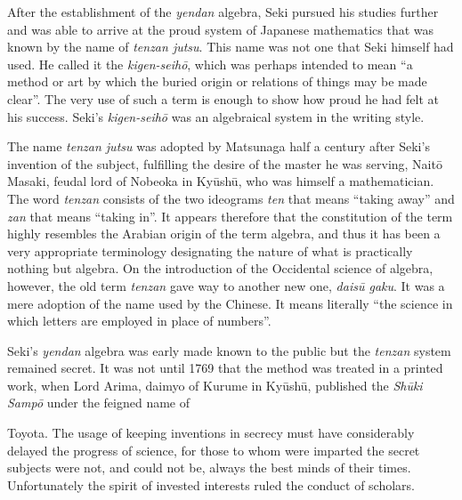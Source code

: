 \documentclass[11pt]{article}
\newcommand{\scanpage}[2]{\clearpage\setcounter{footnote}{0}\noindent{\footnotesize\color{gray}PDF page #1 · #2}\par\medskip}
\newcommand{\scanfooter}{}
\begin{document}
After the establishment of the \emph{yendan} algebra, Seki pursued his studies further and was able to arrive at the proud system of Japanese mathematics that was known by the name of \emph{tenzan jutsu}. This name was not one that Seki himself had used. He called it the \emph{kigen-seihō}, which was perhaps intended to mean ``a method or art by which the buried origin or relations of things may be made clear''. The very use of such a term is enough to show how proud he had felt at his success. Seki's \emph{kigen-seihō} was an algebraical system in the writing style.

The name \emph{tenzan jutsu} was adopted by Matsunaga half a century after Seki's invention of the subject, fulfilling the desire of the master he was serving, Naitō Masaki, feudal lord of Nobeoka in Kyūshū, who was himself a mathematician. The word \emph{tenzan} consists of the two ideograms \emph{ten} that means ``taking away'' and \emph{zan} that means ``taking in''. It appears therefore that the constitution of the term highly resembles the Arabian origin of the term algebra, and thus it has been a very appropriate terminology designating the nature of what is practically nothing but algebra. On the introduction of the Occidental science of algebra, however, the old term \emph{tenzan} gave way to another new one, \emph{daisū gaku}. It was a mere adoption of the name used by the Chinese. It means literally ``the science in which letters are employed in place of numbers''.

Seki's \emph{yendan} algebra was early made known to the public but the \emph{tenzan} system remained secret. It was not until 1769 that the method was treated in a printed work, when Lord Arima, daimyo of Kurume in Kyūshū, published the \emph{Shūki Sampō} under the feigned name of
\scanfooter

\scanpage{0175}{Chapter 22, printed page 161}
Toyota. The usage of keeping inventions in secrecy must have considerably delayed the progress of science, for those to whom were imparted the secret subjects were not, and could not be, always the best minds of their times. Unfortunately the spirit of invested interests ruled the conduct of scholars.
\end{document}
